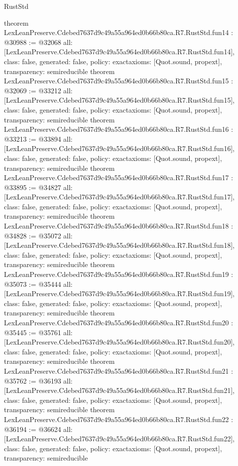 \begin{lexlean}{RustStd}
\begin{coremodule}
{}
theorem LexLeanPreserve.Cdebed7637d9c49a55a964ed0b66b80ca.R7.RustStd.fun14 : @30988 := @32068 {
  all: [LexLeanPreserve.Cdebed7637d9c49a55a964ed0b66b80ca.R7.RustStd.fun14],
  class: false,
  generated: false,
  policy: exact{axioms: [Quot.sound, propext]},
  transparency: semireducible
}
theorem LexLeanPreserve.Cdebed7637d9c49a55a964ed0b66b80ca.R7.RustStd.fun15 : @32069 := @33212 {
  all: [LexLeanPreserve.Cdebed7637d9c49a55a964ed0b66b80ca.R7.RustStd.fun15],
  class: false,
  generated: false,
  policy: exact{axioms: [Quot.sound, propext]},
  transparency: semireducible
}
theorem LexLeanPreserve.Cdebed7637d9c49a55a964ed0b66b80ca.R7.RustStd.fun16 : @33213 := @33894 {
  all: [LexLeanPreserve.Cdebed7637d9c49a55a964ed0b66b80ca.R7.RustStd.fun16],
  class: false,
  generated: false,
  policy: exact{axioms: [Quot.sound, propext]},
  transparency: semireducible
}
theorem LexLeanPreserve.Cdebed7637d9c49a55a964ed0b66b80ca.R7.RustStd.fun17 : @33895 := @34827 {
  all: [LexLeanPreserve.Cdebed7637d9c49a55a964ed0b66b80ca.R7.RustStd.fun17],
  class: false,
  generated: false,
  policy: exact{axioms: [Quot.sound, propext]},
  transparency: semireducible
}
theorem LexLeanPreserve.Cdebed7637d9c49a55a964ed0b66b80ca.R7.RustStd.fun18 : @34828 := @35072 {
  all: [LexLeanPreserve.Cdebed7637d9c49a55a964ed0b66b80ca.R7.RustStd.fun18],
  class: false,
  generated: false,
  policy: exact{axioms: [Quot.sound, propext]},
  transparency: semireducible
}
theorem LexLeanPreserve.Cdebed7637d9c49a55a964ed0b66b80ca.R7.RustStd.fun19 : @35073 := @35444 {
  all: [LexLeanPreserve.Cdebed7637d9c49a55a964ed0b66b80ca.R7.RustStd.fun19],
  class: false,
  generated: false,
  policy: exact{axioms: [Quot.sound, propext]},
  transparency: semireducible
}
theorem LexLeanPreserve.Cdebed7637d9c49a55a964ed0b66b80ca.R7.RustStd.fun20 : @35445 := @35761 {
  all: [LexLeanPreserve.Cdebed7637d9c49a55a964ed0b66b80ca.R7.RustStd.fun20],
  class: false,
  generated: false,
  policy: exact{axioms: [Quot.sound, propext]},
  transparency: semireducible
}
theorem LexLeanPreserve.Cdebed7637d9c49a55a964ed0b66b80ca.R7.RustStd.fun21 : @35762 := @36193 {
  all: [LexLeanPreserve.Cdebed7637d9c49a55a964ed0b66b80ca.R7.RustStd.fun21],
  class: false,
  generated: false,
  policy: exact{axioms: [Quot.sound, propext]},
  transparency: semireducible
}
theorem LexLeanPreserve.Cdebed7637d9c49a55a964ed0b66b80ca.R7.RustStd.fun22 : @36194 := @36624 {
  all: [LexLeanPreserve.Cdebed7637d9c49a55a964ed0b66b80ca.R7.RustStd.fun22],
  class: false,
  generated: false,
  policy: exact{axioms: [Quot.sound, propext]},
  transparency: semireducible
}
\end{coremodule}
\end{lexlean}
